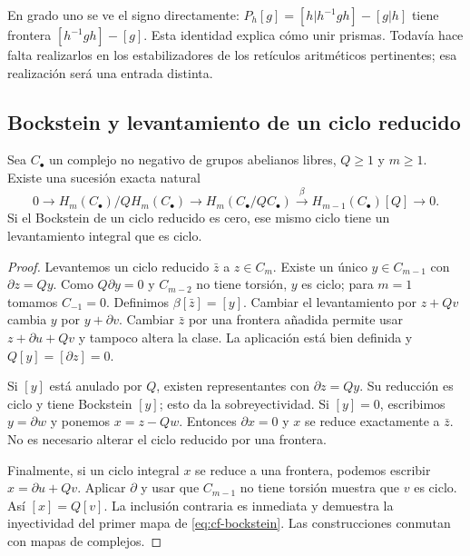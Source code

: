 En grado uno se ve el signo directamente:
$P_h[g]=[h|h^{-1}gh]-[g|h]$ tiene frontera
$[h^{-1}gh]-[g]$. Esta identidad explica cómo unir prismas.
Todavía hace falta realizarlos en los estabilizadores de los
retículos aritméticos pertinentes; esa realización será una entrada
distinta.

\subsection{Bockstein y levantamiento de un ciclo reducido}

\begin{lema}
\label{lem:cf-bockstein}
Sea $C_\bullet$ un complejo no negativo de grupos abelianos libres,
$Q\ge1$ y $m\ge1$. Existe una sucesión exacta natural
\begin{equation}
 0\longrightarrow H_m(C_\bullet)/QH_m(C_\bullet)
 \longrightarrow H_m(C_\bullet/QC_\bullet)
 \xrightarrow{\ \beta\ }H_{m-1}(C_\bullet)[Q]
 \longrightarrow0.
 \label{eq:cf-bockstein}
\end{equation}
Si el Bockstein de un ciclo reducido es cero, ese mismo ciclo
tiene un levantamiento integral que es ciclo.
\end{lema}

\begin{proof}
Levantemos un ciclo reducido $\bar z$ a $z\in C_m$.
Existe un único $y\in C_{m-1}$ con $\partial z=Qy$.
Como $Q\partial y=0$ y $C_{m-2}$ no tiene torsión,
$y$ es ciclo; para $m=1$ tomamos $C_{-1}=0$.
Definimos $\beta[\bar z]=[y]$.
Cambiar el levantamiento por $z+Qv$ cambia $y$ por $y+\partial v$.
Cambiar $\bar z$ por una frontera añadida permite usar
$z+\partial u+Qv$ y tampoco altera la clase. La aplicación está
bien definida y $Q[y]=[\partial z]=0$.

Si $[y]$ está anulado por $Q$, existen representantes con
$\partial z=Qy$. Su reducción es ciclo y tiene Bockstein $[y]$;
esto da la sobreyectividad. Si $[y]=0$, escribimos
$y=\partial w$ y ponemos $x=z-Qw$. Entonces $\partial x=0$
y $x$ se reduce exactamente a $\bar z$. No es necesario alterar
el ciclo reducido por una frontera.

Finalmente, si un ciclo integral $x$ se reduce a una frontera,
podemos escribir $x=\partial u+Qv$. Aplicar $\partial$ y usar
que $C_{m-1}$ no tiene torsión muestra que $v$ es ciclo.
Así $[x]=Q[v]$. La inclusión contraria es inmediata y demuestra
la inyectividad del primer mapa de \eqref{eq:cf-bockstein}.
Las construcciones conmutan con mapas de complejos.
\end{proof}


